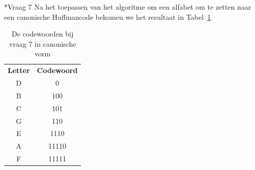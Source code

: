 \documentclass[]{article}
\begin{document}
\begin{section}
\begin{subsection}
    \end{subsection}

    \begin{subsection}*{Vraag 7}
        Na het toepassen van het algoritme om een alfabet om te zetten
        naar een canonische Huffmancode bekomen we het resultaat in
        Tabel~\ref{tab:canonical_codes}.

        \begin{table}
            \centering
            \begin{tabular}{c|c}
            \textbf{Letter} &
            \textbf{Codewoord} \\
            D & 0 \\
            B & 100 \\
            C & 101 \\
            G & 110 \\
            E & 1110 \\
            A & 11110 \\
            F & 11111 \\
            \end{tabular}
            \caption{De codewoorden bij vraag 7 in canonische vorm}
            \label{tab:canonical_codes}
        \end{table}

    \end{subsection}

\end{section}
\newpage
\end{document}
